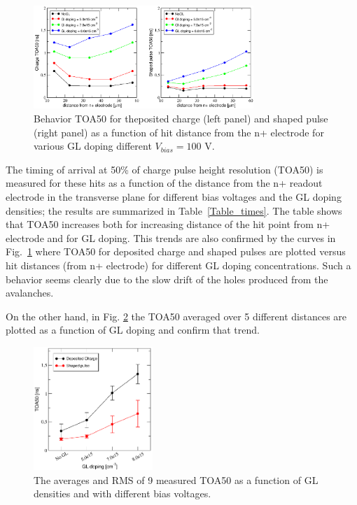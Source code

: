 \documentclass[aps,pt14,superscriptaddress,floatfix,nofootinbib]{revtex4}
\begin{document}
\begin{figure}[hbtp]
\begin{center}
\includegraphics[width=0.74\textwidth,keepaspectratio]{figures1/ToA50_vs_distance.pdf}
\caption{Behavior TOA50 for theposited charge (left panel) and shaped pulse (right panel) as a function of hit distance from the n+ electrode for various GL doping different $V_{bias}=100$ V.~\label{fig:toarms1}}
\end{center}
\end{figure}


The timing of arrival at 50\% of charge pulse height resolution (TOA50) is measured for these hits 
as a function of the distance from the n+ readout electrode in the transverse plane for different bias voltages and the GL doping densities; the results are summarized in Table~\ref{Table_times}. The table shows that TOA50 increases both for increasing distance of the hit point from n+ electrode and for GL doping. This trends are also confirmed by the curves in Fig.~\ref{fig:toarms1} where TOA50 for deposited charge and shaped pulses are plotted versus hit distances (from n+ electrode) for different GL doping concentrations. Such a behavior seems clearly due to the slow drift of the holes produced from the avalanches.  

On the other hand, in Fig. \ref{fig:toarms2} the TOA50 averaged over 5 different distances are plotted as a function of GL doping and confirm that trend.


\begin{figure}[hbtp]
\begin{center}
\includegraphics[width=0.40\textwidth,keepaspectratio]{figures1/ToA50_vs_GLdoping.pdf}
\caption{The averages and RMS of 9 measured TOA50 as a function of GL densities and with different bias 
voltages.~\label{fig:toarms2}}
\end{center}
\end{figure}
\end{document}
